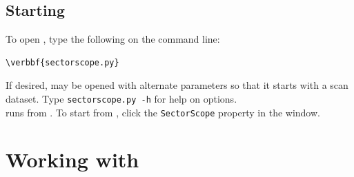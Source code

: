 \documentclass[11pt,fleqn]{article} %
\begin{document}
\subsection{Starting \sscope}
To open \sscope, type the following on the command line:
\begin{Verbatim}[commandchars=\\\{\}]
\verbbf{sectorscope.py}
\end{Verbatim}
If desired, \sscope may be opened with alternate parameters so that it starts with a scan dataset. Type \verb+sectorscope.py -h+ for help on options.\\

\sscope runs from \aut. To start \sscope from \aut, click the \verb+SectorScope+ property in the \aut window.

\section{Working with \sscope}
\end{document}

